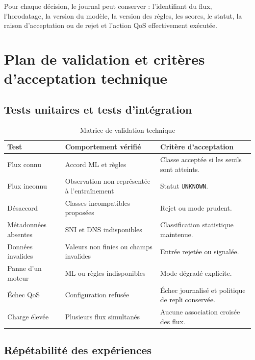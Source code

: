 Pour chaque décision, le journal peut conserver :
l'identifiant du flux, l'horodatage, la version du modèle,
la version des règles, les scores, le statut, la raison
d'acceptation ou de rejet et l'action QoS effectivement
exécutée.

\section{Plan de validation et critères d'acceptation technique}

\subsection{Tests unitaires et tests d'intégration}

\begin{table}[H]
\centering
\caption{Matrice de validation technique}
\label{tab:validation_technique}
\begin{tabularx}{\textwidth}{|l|X|X|}
\hline
\textbf{Test} & \textbf{Comportement vérifié} &
\textbf{Critère d'acceptation} \\
\hline
Flux connu & Accord ML et règles &
Classe acceptée si les seuils sont atteints. \\
\hline
Flux inconnu & Observation non représentée à l'entraînement &
Statut \texttt{UNKNOWN}. \\
\hline
Désaccord & Classes incompatibles proposées &
Rejet ou mode prudent. \\
\hline
Métadonnées absentes & SNI et DNS indisponibles &
Classification statistique maintenue. \\
\hline
Données invalides & Valeurs non finies ou champs invalides &
Entrée rejetée ou signalée. \\
\hline
Panne d'un moteur & ML ou règles indisponibles &
Mode dégradé explicite. \\
\hline
Échec QoS & Configuration refusée &
Échec journalisé et politique de repli conservée. \\
\hline
Charge élevée & Plusieurs flux simultanés &
Aucune association croisée des flux. \\
\hline
\end{tabularx}
\end{table}

\subsection{Répétabilité des expériences}

